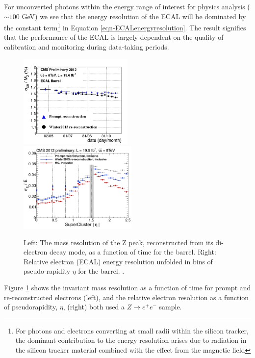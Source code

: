 For unconverted photons within the energy range of interest for physics analysis ($\sim100$ GeV) we see that the energy resolution of the ECAL will be dominated by the constant term\footnote{For photons and electrons converting at small radii within the silicon tracker, the dominant contribution to the energy resolution arises due to radiation in the silicon tracker material combined with the effect from the magnetic field} in Equation \ref{eqn-ECALenergyresolution}. The result signifies that the performance of the ECAL is largely dependent on the quality of calibration and monitoring during data-taking periods. 

\begin{figure} 
\includegraphics[width=0.50\textwidth]{Figures/EcalInvariantMass.png}
\includegraphics[width=0.52\textwidth]{Figures/EcalEtaInclusive.png}
\caption{Left: The mass resolution of the Z peak, reconstructed from its di-electron decay mode, as a function of time for the barrel. Right: Relative electron (ECAL) energy resolution unfolded in bins of pseudo-rapidity $\eta$ for the barrel. \cite{ECALPerformance}.}
\label{fig-ECALperformance}
\end{figure}


Figure \ref{fig-ECALperformance} shows the invariant mass resolution as a function of time for prompt and re-reconstructed electrons (left), and the relative electron resolution as a function of pseudorapidity, $\eta$, (right) both used a $Z \to e^+e^-$ sample. 


